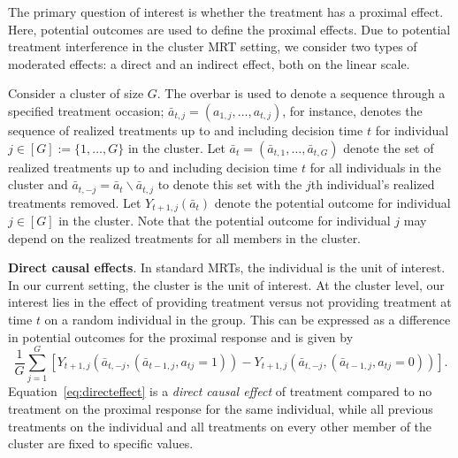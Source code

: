 \documentclass[12pt]{article}
\newcommand{\zw}[1]{\textcolor{blue}{[\textit{ZW: #1}]}}
\begin{document}
The primary question of interest is whether the treatment has a proximal effect. Here, potential outcomes are used to define the proximal effects. Due to potential treatment interference in the cluster MRT setting, we consider two types of moderated effects: a direct and an indirect effect, both on the linear scale.

Consider a cluster of size $G$.  The overbar is used to denote a sequence through a specified treatment occasion; $\bar a_{t,j} = (a_{1,j},\ldots, a_{t,j})$, for instance, denotes the sequence of realized treatments up to and including decision time $t$ for individual $j \in [G]:=\{1,\ldots, G\}$ in the cluster.   Let $\bar a_{t} = (\bar a_{t,1}, \ldots, \bar a_{t,G})$ denote the set of realized treatments up to and including decision time $t$ for all individuals in the cluster and $\bar a_{t,-j} = \bar a_t \backslash \bar a_{t,j}$ to denote this set with the $j$th individual's realized treatments removed. Let $Y_{t+1,j} (\bar a_{t})$ denote the potential outcome for individual $j \in [G]$ in the cluster.  Note that the potential outcome for individual $j$ may depend on the realized treatments for all members in the cluster.

\noindent \textbf{Direct causal effects}.
In standard MRTs, the individual is the unit of interest.  In our current setting, the cluster is the unit of interest.  At the cluster level, our interest lies in the effect of providing treatment versus not providing treatment at time $t$ on a random individual in the group.  This can be expressed as a difference in potential outcomes for the proximal response and is given by
\begin{equation}
\label{eq:directeffect}
\frac{1}{G} \sum_{j=1}^G \left[ Y_{t+1,j} (\bar a_{t,-j}, (\bar a_{t-1,j}, a_{tj}=1)) - Y_{t+1,j} (\bar a_{t,-j}, (\bar a_{t-1,j}, a_{tj}=0)) \right].
\end{equation}
Equation~\eqref{eq:directeffect} is a \emph{direct causal effect} of treatment compared to no treatment on the proximal response for the same individual, while all previous treatments on the individual and all treatments on every other member of the cluster are fixed to specific values.
\end{document}
